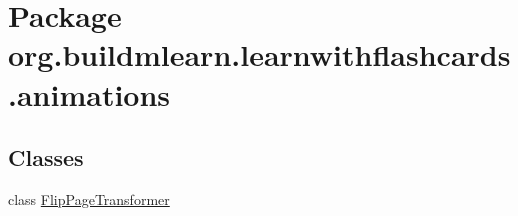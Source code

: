 \hypertarget{namespaceorg_1_1buildmlearn_1_1learnwithflashcards_1_1animations}{}\section{Package org.\+buildmlearn.\+learnwithflashcards.\+animations}
\label{namespaceorg_1_1buildmlearn_1_1learnwithflashcards_1_1animations}
\subsection*{Classes}
\begin{DoxyCompactItemize}
\item 
class \hyperlink{classorg_1_1buildmlearn_1_1learnwithflashcards_1_1animations_1_1FlipPageTransformer}{Flip\+Page\+Transformer}
\end{DoxyCompactItemize}

